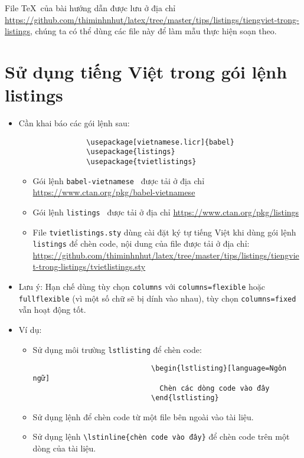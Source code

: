 \documentclass[12pt,a4paper]{article}
\begin{document}
	File \TeX\ của bài hướng dẫn được lưu ở địa chỉ \url{https://github.com/thiminhnhut/latex/tree/master/tips/listings/tiengviet-trong-listings}, chúng ta có thể dùng các file này để làm mẫu thực hiện soạn theo.

\section{Sử dụng tiếng Việt trong gói lệnh listings}
	\begin{itemize}
		\item Cần khai báo các gói lệnh sau:
			\begin{verbatim}
				\usepackage[vietnamese.licr]{babel}
				\usepackage{listings}
				\usepackage{tvietlistings}				
			\end{verbatim}
				\begin{itemize}					
					\item Gói lệnh \verb|babel-vietnamese|~\cite{vietnamese-ctan} được tải ở địa chỉ \url{https://www.ctan.org/pkg/babel-vietnamese}
					
					\item Gói lệnh \verb|listings|~\cite{listings-ctan} được tải ở địa chỉ \url{https://www.ctan.org/pkg/listings}
					
					\item File \verb|tvietlistings.sty| dùng cài đặt ký tự tiếng Việt khi dùng gói lệnh \verb|listings| để chèn code, nội dung của file được tải ở địa chỉ: \url{https://github.com/thiminhnhut/latex/tree/master/tips/listings/tiengviet-trong-listings/tvietlistings.sty}
				\end{itemize}
			
			\item Lưu ý: Hạn chế dùng tùy chọn \verb|columns| với \verb|columns=flexible| hoặc \verb|fullflexible| (vì một số chữ sẽ bị dính vào nhau), tùy chọn \verb|columns=fixed| vẫn hoạt động tốt.
			\item Ví dụ:
				\begin{itemize}
					\item Sử dụng môi trường \verb|lstlisting| để chèn code:
						\begin{verbatim}
							\begin{lstlisting}[language=Ngôn ngữ]
							  Chèn các dòng code vào đây
							\end{lstlisting}
						\end{verbatim}
					\item Sử dụng lệnh \verb|| để chèn code từ một file bên ngoài vào tài liệu.
					
					\item Sử dụng lệnh \verb|\lstinline{chèn code vào đây}| để chèn code trên một dòng của tài liệu.
				\end{itemize}
	\end{itemize}
\end{document}
